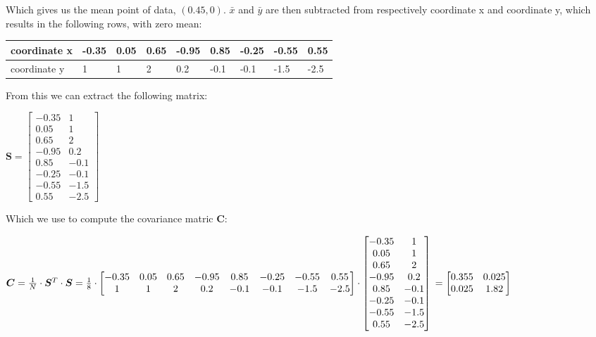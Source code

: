 \documentclass{report}
\begin{document}
\noindent Which gives us the mean point of data, $(0.45, 0)$. $\bar{x}$ and $\bar{y}$ are then subtracted from respectively coordinate x and coordinate y, which results in the following rows, with zero mean:
\begin{center}
    \begin{tabular}{|l|l|l|l|l|l|l|l|l|}
        \hline
        coordinate x & -0.35 & 0.05 & 0.65 & -0.95 & 0.85 & -0.25 & -0.55 & 0.55 \\
        \hline
        coordinate y & 1 & 1 & 2 & 0.2 & -0.1 & -0.1 & -1.5 & -2.5 \\
        \hline
    \end{tabular}
\end{center}
From this we can extract the following matrix:
\begin{center}
    \begin{math}
        \bm{S} = 
        \begin{bmatrix}
            -0.35 & 1 \\
            0.05 & 1 \\
            0.65 & 2 \\
            -0.95 & 0.2 \\
            0.85 & -0.1 \\
            -0.25 & -0.1 \\
            -0.55 & -1.5 \\
            0.55 & -2.5
        \end{bmatrix}
    \end{math}
\end{center}
Which we use to compute the covariance matric $\bm{C}$:
\begin{center}
    \begin{math}
        \bm{C} = \frac{1}{N} \cdot \bm{S}^T \cdot \bm{S}
        = \frac{1}{8} \cdot 
        \begin{bmatrix}
            -0.35 & 0.05 & 0.65 & -0.95 & 0.85 & -0.25 & -0.55 & 0.55 \\
            1 & 1 & 2 & 0.2 & -0.1 & -0.1 & -1.5 & -2.5
        \end{bmatrix}
        \cdot 
        \begin{bmatrix}
            -0.35 & 1 \\
            0.05 & 1 \\
            0.65 & 2 \\
            -0.95 & 0.2 \\
            0.85 & -0.1 \\
            -0.25 & -0.1 \\
            -0.55 & -1.5 \\
            0.55 & -2.5
        \end{bmatrix} \newline
        =
        \begin{bmatrix}
            0.355 & 0.025 \\
            0.025 & 1.82
        \end{bmatrix}
    \end{math}
\end{center}
\end{document}

